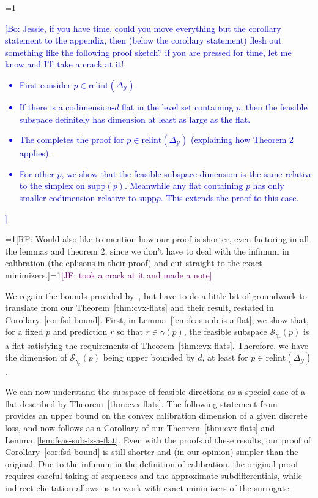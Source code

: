 \documentclass{article}
\newcommand{\Comments}{1}
\newcommand{\mynote}[2]{\ifnum\Comments=1\textcolor{#1}{#2}\fi}
\newcommand{\raf}[1]{\mynote{green!80!blue}{[RF: #1]}}
\newcommand{\jessie}[1]{\mynote{purple}{[JF: #1]}}
\newcommand{\bo}[1]{\mynote{blue}{[Bo: #1]}}
\newcommand{\simplex}{\Delta_\Y}
\newcommand{\relint}[1]{\mathrm{relint}(#1)}
\newcommand{\supp}{\mathrm{supp}}
\newcommand{\Sc}{\mathcal{S}}  %
\newcommand{\Y}{\mathcal{Y}}
\begin{document}
\bo{Jessie, if you have time, could you move everything but the corollary statement to the appendix, then (below the corollary statement) flesh out something like the following proof sketch? if you are pressed for time, let me know and I'll take a crack at it!
\begin{itemize}
  \item First consider $p \in \relint{\simplex}$.
  \item If there is a codimension-$d$ flat in the level set containing $p$, then the feasible subspace definitely has dimension at least as large as the flat.
  \item The completes the proof for $p \in \relint{\simplex}$ (explaining how Theorem 2 applies).
  \item For other $p$, we show that the feasible subspace dimension is the same relative to the simplex on $\supp(p)$. Meanwhile any flat containing $p$ has only smaller codimension relative to $\supp{p}$. This extends the proof to this case.
\end{itemize}
} %
\raf{Would also like to mention how our proof is shorter, even factoring in all the lemmas and theorem 2, since we don't have to deal with the infimum in calibration (the eplisons in their proof) and cut straight to the exact minimizers.}\jessie{took a crack at it and made a note}

We regain the bounds provided by~\citet[Theorem 16]{ramaswamy2016convex}, but have to do a little bit of groundwork to translate from our Theorem~\ref{thm:cvx-flats} and their result, restated in Corollary~\ref{cor:fsd-bound}.
First, in Lemma~\ref{lem:feas-sub-is-a-flat}, we show that, for a fixed $p$ and prediction $r$ so that $r \in \gamma(p)$, the feasible subspace $\Sc_{\gamma_r}(p)$ is a flat satisfying the requirements of Theorem~\ref{thm:cvx-flats}.
Therefore, we have the dimension of $\Sc_{\gamma_r}(p)$ being upper bounded by $d$, at least for $p \in \relint{\simplex}$. 

We can now understand the subspace of feasible directions as a special case of a flat described by Theorem~\ref{thm:cvx-flats}.
The following statement from~\citet{ramaswamy2016convex} provides an upper bound on the convex calibration dimension of a given discrete loss, and now follows as a Corollary of our Theorem~\ref{thm:cvx-flats} and Lemma~\ref{lem:feas-sub-is-a-flat}.
Even with the proofs of these results, our proof of Corollary~\ref{cor:fsd-bound} is still shorter and (in our opinion) simpler than the original.
Due to the infimum in the definition of calibration, the original proof requires careful taking of sequences and the approximate subdifferentials, while indirect elicitation allows us to work with exact minimizers of the surrogate.
\end{document}
